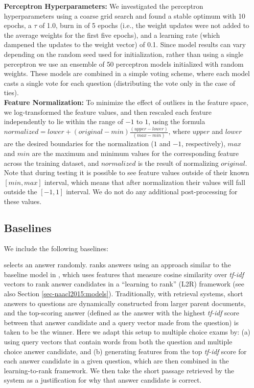 {\flushleft \textbf{Perceptron Hyperparameters:}} We investigated the perceptron hyperparameters using a coarse grid search and found a stable optimum with 10 epochs, a $\tau$ of 1.0, burn in of 5 epochs (i.e., the weight updates were not added to the average weights for the first five epochs), and a learning rate (which dampened the updates to the weight vector) of 0.1. Since model results can vary depending on the random seed used for initialization, rather than using a single perceptron we use an ensemble of 50 perceptron models initialized with random weights.  These models are combined in a simple voting scheme, where each model casts a single vote for each question (distributing the vote only in the case of ties).\\

{\flushleft \textbf{Feature Normalization:}} To minimize the effect of outliers in the feature space, we log-transformed the feature values, and then rescaled each feature independently to lie within the range of $-1$ to $1$, using the formula
\mbox{$normalized  = lower + (original - min)\frac{(upper - lower)}{(max - min)}$},
where $upper$ and $lower$ are the desired boundaries for the normalization ($1$ and $-1$, respectively), $max$ and $min$ are the maximum and minimum values for the corresponding feature across the training dataset, and $normalized$ is the result of normalizing $original$.
Note that during testing it is possible to see feature values outside of their known $[min, max]$ interval, which means that after normalization their values will fall outside the $[-1, 1]$ interval. We do not do any additional post-processing for these values.


\subsection{Baselines}
\label{sec-cl2017:baselines}

We include the following baselines: 

{} selects an answer randomly.
{} ranks answers using an approach similar to the baseline model in \citet{jansen14}, which uses features that measure cosine similarity over {\em tf-idf} vectors \citep[][Ch. 6]{manning08} to rank answer candidates in a ``learning to rank'' (L2R) framework (see also Section \ref{sec-naacl2015:models}).  
Traditionally, with retrieval systems, short answers to questions are dynamically constructed from larger parent documents, and the top-scoring answer (defined as the answer with the highest {\em tf-idf} score between that answer candidate and a query vector made from the question) is taken to be the winner.  Here we adapt this setup to multiple choice exams by: (a) using query vectors that contain words from both the question and multiple choice answer candidate, and (b) generating features from the top {\em tf-idf} score for each answer candidate in a given question, which are then combined in the learning-to-rank framework.  We then take the short passage retrieved by the system as a justification for why that answer candidate is correct. 

